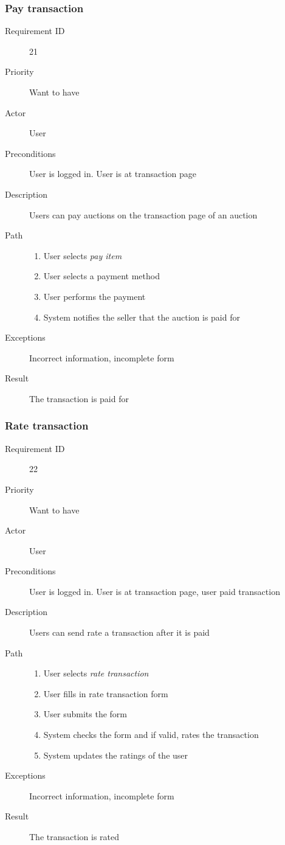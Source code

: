 		\subsubsection{Pay transaction}
			\begin{description}
				\item[Requirement ID] 21
				\item[Priority] Want to have
				\item[Actor] User
				\item[Preconditions] User is logged in. User is at transaction page
				\item[Description] Users can pay auctions on the transaction page of an auction
				\item[Path]
 					\begin{enumerate}
						\item User selects \emph{pay item}
						\item User selects a payment method
						\item User performs the payment
						\item System notifies the seller that the auction is paid for
					\end{enumerate}
				\item[Exceptions] Incorrect information, incomplete form
				\item[Result] The transaction is paid for
			\end{description}
		\subsubsection{Rate transaction}
			\begin{description}
				\item[Requirement ID] 22
				\item[Priority] Want to have
				\item[Actor] User
				\item[Preconditions] User is logged in. User is at transaction page, user paid transaction
				\item[Description] Users can send rate a transaction after it is paid
				\item[Path]
 					\begin{enumerate}
						\item User selects \emph{rate transaction}
						\item User fills in rate transaction form
						\item User submits the form
						\item System checks the form and if valid, rates the transaction
						\item System updates the ratings of the user
					\end{enumerate}
				\item[Exceptions] Incorrect information, incomplete form
				\item[Result] The transaction is rated
			\end{description}

